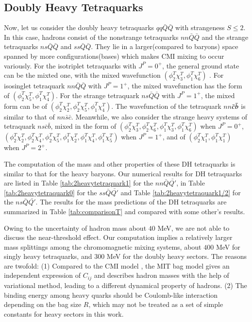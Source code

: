 \documentclass[12pt,onecolumn,floatfix,nofootinbib]{revtex4}
\begin{document}
\subsection{Doubly Heavy Tetraquarks}

Now, let us consider the doubly heavy tetraquarks $qq\bar{Q}\bar{Q}$ with
strangeness $S\leq 2$. In this case, hadrons consist of the nonstrange
tetraquarks $nn\bar{Q}\bar{Q}$ and the strange tetraquarks $ns\bar{Q}\bar{Q}$
and $ss\bar{Q}\bar{Q}$. They lie in a larger(compared to baryons) space
spanned by more configurations(bases) which makes CMI mixing to occur
variously. For the isotriplet tetraquarks with $J^{P}=0^{+}$, the general
ground state can be the mixted one, with the mixed wavefunction $(\phi
_{2}^{T}\chi _{3}^{T},\phi _{1}^{T}\chi _{6}^{T})$ . For isosinglet
tetraquark $nn\bar{Q}\bar{Q}$ with $J^{P}=1^{+}$, the mixed wavefunction has
the form of $(\phi _{2}^{T}\chi _{5}^{T},\phi _{1}^{T}\chi _{4}^{T})$. For
the strange tetraquark $ns\bar{Q}\bar{Q}$ with $J^{P}=1^{+}$, the mixed form
can be of $(\phi _{2}^{T}\chi _{2}^{T},\phi _{2}^{T}\chi _{5}^{T},\phi
_{1}^{T}\chi _{4}^{T})$. The wavefunction of the tetraquark $nn$$\bar{c}\bar{%
b}$ is similar to that of $nn\bar{s}\bar{c}$. Meanwhile, we also consider
the strange heavy systems of tetraquark $ns\bar{c}\bar{b}$, mixed in the
form of $(\phi _{2}^{T}\chi _{3}^{T},\phi _{2}^{T}\chi _{6}^{T},\phi
_{1}^{T}\chi _{3}^{T},\phi _{1}^{T}\chi _{6}^{T})$ when $J^{P}=0^{+}$, $%
(\phi _{2}^{T}\chi _{2}^{T},\phi _{2}^{T}\chi _{4}^{T},\phi _{2}^{T}\chi
_{5}^{T},\phi _{1}^{T}\chi _{2}^{T},\phi _{1}^{T}\chi _{4}^{T},\phi
_{1}^{T}\chi _{5}^{T})$ when $J^{P}=1^{+}$, and of $(\phi _{2}^{T}\chi
_{1}^{T},\phi _{1}^{T}\chi _{1}^{T})$ when $J^{P}=2^{+}$. 

The computation of the mass and other properties of these DH tetraquarks is
similar to that for the heavy baryons. Our numerical results for DH
tetraquarks are listed in Table \ref{tab:2heavytetraquark1} for the $nn\bar{Q%
}\bar{Q\prime }$, in Table \ref{tab:2heavytetraquark0} for the $ss\bar{Q}%
\bar{Q\prime }$ and Table \ref{tab:2heavytetraquark1/2} for the $ns\bar{Q}%
\bar{Q\prime }$. The results for the mass predictions of the DH tetraquarks
are summarized in Table \ref{tab:comparisonT} and compared with some other's
results.

Owing to the uncertainty of hadron mass about $40$ MeV, we are not able to
discuss the near-threshold effect. Our computation implies a relatively
larger mass splittings among the chromomagnetic mixing systems, about $400$
MeV for singly heavy tetraquarks, and $300$ MeV for the doubly heavy
sectors. The reasons are twofold: (1) Compared to the CMI model \cite%
{Luo:2017eub,Lu:2020rog}, the MIT bag model gives an independent expression
of $C_{ij}$ and describes hadron masses with the help of variational method,
leading to a different dynamical property of hadrons. (2) The binding energy
among heavy quarks should be Coulomb-like interaction depending on the bag
size $R$, which may not be treated as a set of simple constants for heavy
sectors in this work.
\end{document}
